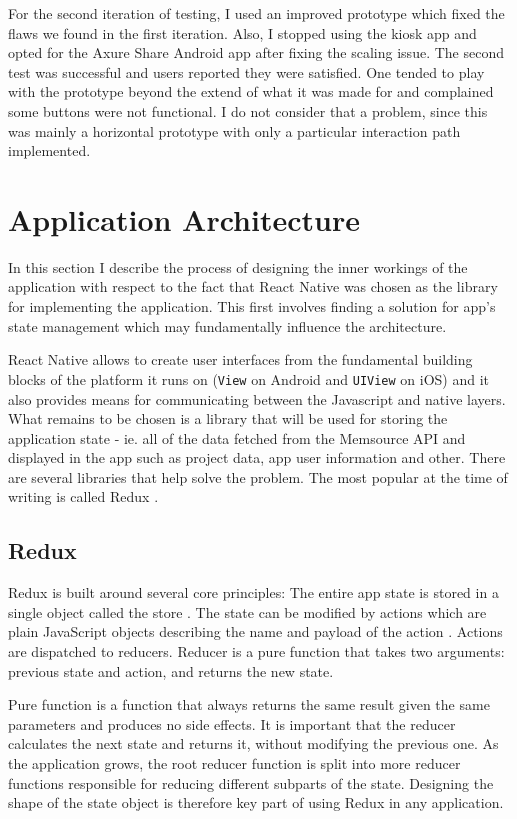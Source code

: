 For the second iteration of testing, I used an improved prototype which fixed the flaws we found in the first iteration. Also, I stopped using the kiosk app and opted for the Axure Share Android app after fixing the scaling issue. The second test was successful and users reported they were satisfied. One tended to play with the prototype beyond the extend of what it was made for and complained some buttons were not functional. I do not consider that a problem, since this was mainly a horizontal prototype with only a particular interaction path implemented.



\section{Application Architecture}

In this section I describe the process of designing the inner workings of the application with respect to the fact that React Native was chosen as the library for implementing the application. This first involves finding a solution for app's state management which may fundamentally influence the architecture.


React Native allows to create user interfaces from the fundamental building blocks of the platform it runs on (\texttt{View} on Android and \texttt{UIView} on iOS) and it also provides means for communicating between the Javascript and native layers. What remains to be chosen is a library that will be used for storing the application state - ie. all of the data fetched from the Memsource API and displayed in the app such as project data, app user information and other. There are several libraries that help solve the problem. The most popular at the time of writing is called Redux \cite{stateOfJS}.

\subsection{Redux}

Redux is built around several core principles:
The entire app state is stored in a single object called the store \cite{redux:store}. The state can be modified by actions which are plain JavaScript objects describing the name and payload of the action \cite{redux:store}. Actions are dispatched to reducers. Reducer is a pure function that takes two arguments: previous state and action, and returns the new state.

Pure function  is a function that always returns the same result given the same parameters and produces no side effects. It is important that the reducer calculates the next state and returns it, without modifying the previous one.
As the application grows, the root reducer function is split into more reducer functions responsible for reducing different subparts of the state. Designing the shape of the state object is therefore key part of using Redux in any application.

